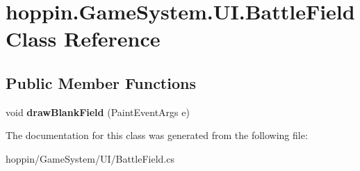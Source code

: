 \hypertarget{classhoppin_1_1_game_system_1_1_u_i_1_1_battle_field}{}\section{hoppin.\+Game\+System.\+U\+I.\+Battle\+Field Class Reference}
\label{classhoppin_1_1_game_system_1_1_u_i_1_1_battle_field}
\subsection*{Public Member Functions}
\begin{DoxyCompactItemize}
\item 
void {\bfseries draw\+Blank\+Field} (Paint\+Event\+Args e)\hypertarget{classhoppin_1_1_game_system_1_1_u_i_1_1_battle_field_a3e68abe57917a30fa2710d58ece951c8}{}\label{classhoppin_1_1_game_system_1_1_u_i_1_1_battle_field_a3e68abe57917a30fa2710d58ece951c8}

\end{DoxyCompactItemize}


The documentation for this class was generated from the following file\+:\begin{DoxyCompactItemize}
\item 
hoppin/\+Game\+System/\+U\+I/Battle\+Field.\+cs\end{DoxyCompactItemize}
